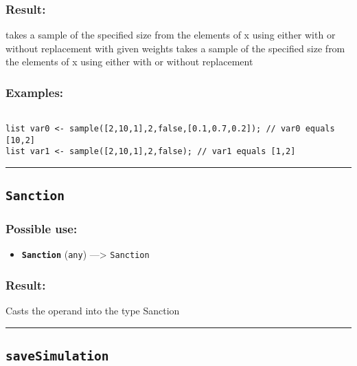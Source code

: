 \documentclass[]{book}
\providecommand{\tightlist}{%
  \setlength{\itemsep}{0pt}\setlength{\parskip}{0pt}}
\theoremstyle{definition}
\theoremstyle{definition}
\theoremstyle{definition}
\theoremstyle{remark}
\begin{document}
\subsubsection{Result:}\label{result-434}

takes a sample of the specified size from the elements of x using either
with or without replacement with given weights takes a sample of the
specified size from the elements of x using either with or without
replacement

\subsubsection{Examples:}\label{examples-309}

\begin{verbatim}
 
list var0 <- sample([2,10,1],2,false,[0.1,0.7,0.2]); // var0 equals [10,2] 
list var1 <- sample([2,10,1],2,false); // var1 equals [1,2]
\end{verbatim}

\begin{center}\rule{0.5\linewidth}{\linethickness}\end{center}

\subsection{\texorpdfstring{\texttt{Sanction}}{Sanction}}\label{sanction}

\subsubsection{Possible use:}\label{possible-use-449}

\begin{itemize}
\tightlist
\item
  \textbf{\texttt{Sanction}} (\texttt{any}) ---\textgreater{}
  \texttt{Sanction}
\end{itemize}

\subsubsection{Result:}\label{result-435}

Casts the operand into the type Sanction

\begin{center}\rule{0.5\linewidth}{\linethickness}\end{center}

\subsection{\texorpdfstring{\texttt{saveSimulation}}{saveSimulation}}\label{savesimulation}
\end{document}
